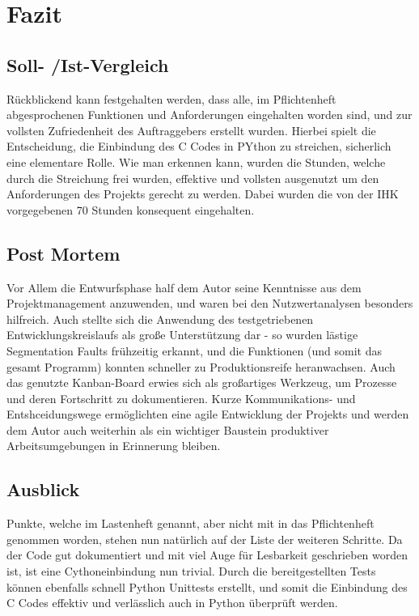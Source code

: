 \section{Fazit}
\label{section:postmortem}
\subsection{Soll- /Ist-Vergleich}
Rückblickend kann festgehalten werden, dass alle, im Pflichtenheft
abgesprochenen Funktionen und Anforderungen eingehalten worden sind,
und zur vollsten Zufriedenheit des Auftraggebers erstellt wurden. Hierbei
spielt die Entscheidung, die Einbindung des C Codes in PYthon zu streichen, sicherlich
eine elementare Rolle. Wie man erkennen kann, wurden die Stunden, welche durch
die Streichung frei wurden, effektive und vollsten ausgenutzt um den Anforderungen
des Projekts gerecht zu werden. Dabei wurden die von der IHK vorgegebenen 70 Stunden
konsequent eingehalten.

\subsection{Post Mortem}

Vor Allem die Entwurfsphase half dem Autor seine Kenntnisse aus dem Projektmanagement anzuwenden,
und waren bei den Nutzwertanalysen besonders hilfreich. Auch stellte sich die Anwendung des
testgetriebenen Entwicklungskreislaufs als große Unterstützung dar - so wurden lästige Segmentation Faults frühzeitig
erkannt, und die Funktionen (und somit das gesamt Programm) konnten schneller zu Produktionsreife heranwachsen.
Auch das genutzte Kanban-Board erwies sich als großartiges Werkzeug, um Prozesse und deren Fortschritt zu dokumentieren.
Kurze Kommunikations- und Entshceidungswege ermöglichten eine agile Entwicklung der Projekts und werden
dem Autor auch weiterhin als ein wichtiger Baustein produktiver Arbeitsumgebungen in Erinnerung bleiben.

\subsection{Ausblick}
Punkte, welche im Lastenheft genannt, aber nicht mit in das Pflichtenheft genommen worden,
stehen nun natürlich auf der Liste der weiteren Schritte. Da der Code gut dokumentiert
und mit viel Auge für Lesbarkeit geschrieben worden ist, ist eine Cythoneinbindung nun trivial.
Durch die bereitgestellten Tests können ebenfalls schnell Python Unittests erstellt, und somit
die Einbindung des C Codes effektiv und verlässlich auch in Python überprüft werden.


